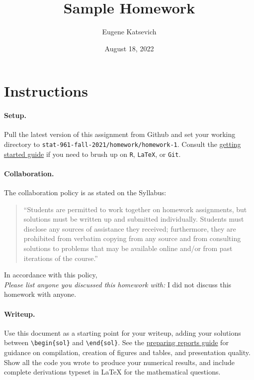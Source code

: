 \documentclass[11pt,letterpaper,english,oneside]{article} %
\author{Eugene Katsevich}
\title{Sample Homework}
\date{August 18, 2022}
\theoremstyle{definition} %
\newtheorem{solution}{Solution}
\newenvironment{sol}{\begin{solution}\hspace{0pt}}{\end{solution}}
\begin{document}
\maketitle

\section{Instructions}

\paragraph{Setup.} Pull the latest version of this assignment from Github and set your working directory to \texttt{stat-961-fall-2021/homework/homework-1}. Consult the \href{https://github.com/Katsevich-Teaching/stat-961-fall-2021/blob/main/getting-started/getting-started.pdf}{getting started guide} if you need to brush up on \texttt{R}, \texttt{LaTeX}, or \texttt{Git}.

\paragraph{Collaboration.} The collaboration policy is as stated on the Syllabus:

\begin{quote}
``Students are permitted to work together on homework assignments, but solutions must be written up and submitted individually. Students must disclose any sources of assistance they received; furthermore, they are prohibited from verbatim copying from any source and from consulting solutions to problems that may be available online and/or from past iterations of the course.''
\end{quote}

\noindent In accordance with this policy, \\

\noindent \textit{Please list anyone you discussed this homework with:} I did not discuss this homework with anyone.

\paragraph{Writeup.} Use this document as a starting point for your writeup, adding your solutions between \verb|\begin{sol}| and \verb|\end{sol}|. See the \href{https://github.com/Katsevich-Teaching/stat-961-fall-2021/blob/main/getting-started/preparing-reports.pdf}{preparing reports guide} for guidance on compilation, creation of figures and tables, and presentation quality. Show all the code you wrote to produce your numerical results, and include complete derivations typeset in LaTeX for the mathematical questions. 
\end{document}
